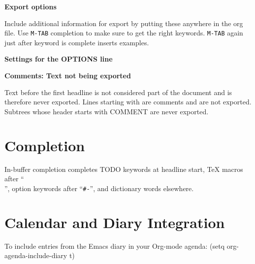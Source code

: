 {\bf Export options}

Include additional information for export by putting these anywhere in the
org file.  Use {\tt M-TAB} completion to make sure to get the right
keywords. {\tt M-TAB} again just after keyword is complete inserts examples.


{\bf Settings for the OPTIONS line}


{\bf Comments: Text not being exported}

Text before the first headline is not considered part of the document
and is therefore never exported.
Lines starting with \kbd{\#} are comments and are not exported.
Subtrees whose header starts with COMMENT are never exported.


\section{Completion}

In-buffer completion completes TODO keywords at headline start, TeX
macros after ``{\tt \\}'', option keywords after ``{\tt \#-}'', and
dictionary words elsewhere.


\newcolumn

\section{Calendar and Diary Integration}

To include entries from the Emacs diary in your Org-mode agenda:
\beginexample%
(setq org-agenda-include-diary t)
\endexample

